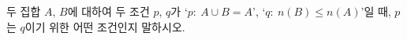 두 집합 $A$, $B$에 대하여 두 조건 $p$, $q$가 `$p:\ A\cup B=A$', `$q:\ n(B)\le n(A)$'일 때, $p$는 $q$이기 위한 어떤 조건인지 말하시오.
